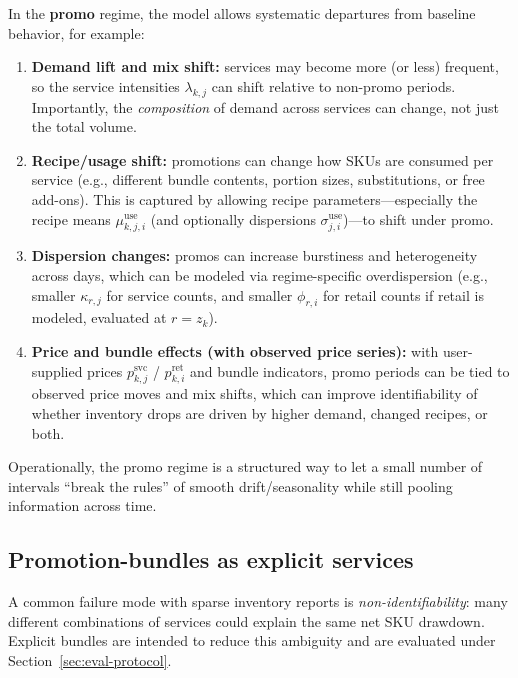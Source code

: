 \documentclass[11pt]{article}
\begin{document}
In the \textbf{promo} regime, the model allows systematic departures from baseline behavior, for example:
\begin{enumerate}
  \item \textbf{Demand lift and mix shift:} services may become more (or less) frequent, so the service intensities $\lambda_{k,j}$ can shift relative to non-promo periods. Importantly, the \emph{composition} of demand across services can change, not just the total volume.

  \item \textbf{Recipe/usage shift:} promotions can change how SKUs are consumed per service (e.g., different bundle contents, portion sizes, substitutions, or free add-ons). This is captured by allowing recipe parameters---especially the recipe means $\mu^{\mathrm{use}}_{k,j,i}$ (and optionally dispersions $\sigma^{\mathrm{use}}_{j,i}$)---to shift under promo.

  \item \textbf{Dispersion changes:} promos can increase burstiness and heterogeneity across days, which can be modeled via regime-specific overdispersion (e.g., smaller $\kappa_{r,j}$ for service counts, and smaller $\phi_{r,i}$ for retail counts if retail is modeled, evaluated at $r=z_k$).

  \item \textbf{Price and bundle effects (with observed price series):} with user-supplied prices $p^{\mathrm{svc}}_{k,j}$ / $p^{\mathrm{ret}}_{k,i}$ and bundle indicators, promo periods can be tied to observed price moves and mix shifts, which can improve identifiability of whether inventory drops are driven by higher demand, changed recipes, or both.
\end{enumerate}

Operationally, the promo regime is a structured way to let a small number of intervals ``break the rules'' of smooth drift/seasonality while still pooling information across time.

\subsection{Promotion-bundles as explicit services}

A common failure mode with sparse inventory reports is \emph{non-identifiability}: many different combinations of services could explain the same net SKU drawdown.
Explicit bundles are intended to reduce this ambiguity and are evaluated under Section~\ref{sec:eval-protocol}.
\end{document}
